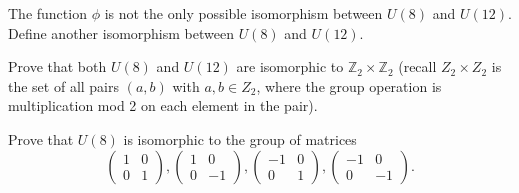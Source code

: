 \begin{exercise}\label{exercise:isomorph:U8_U12_other}
The function $\phi$ is not the only possible isomorphism between $U(8)$ and $U(12)$.  Define another isomorphism between $U(8)$ and $U(12)$.
\end{exercise}

\begin{exercise}\label{exercise:isomorph:U8_U12_Z2Z2}
Prove that both $U(8)$ and $U(12)$ are isomorphic to ${\mathbb Z}_2 \times {\mathbb Z}_2$ (recall $Z_2 \times Z_2$ is the set of all pairs $(a,b)$ with $a,b \in Z_2$, where 
the group operation is multiplication mod 2 on each element in the pair). 
\end{exercise}

 \begin{exercise}\label{exercise:isomorph:iso_prac3}
Prove that $U(8)$ is isomorphic to the group of matrices
\[
\begin{pmatrix}
1 & 0 \\
0 & 1
\end{pmatrix},
\begin{pmatrix}
1 & 0 \\
0 & -1
\end{pmatrix},
\begin{pmatrix}
-1 & 0 \\
0 & 1
\end{pmatrix},
\begin{pmatrix}
-1 & 0 \\
0 & -1
\end{pmatrix}.
\]
\end{exercise} 

